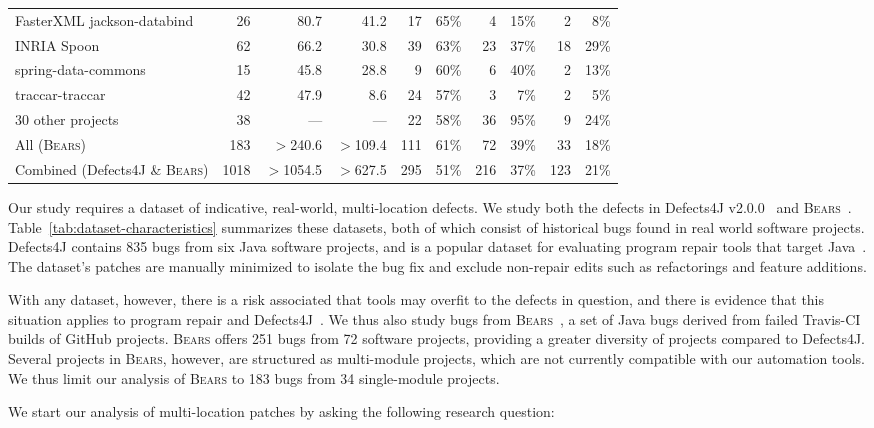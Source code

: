 \documentclass[10pt, conference]{IEEEtran}
\newcommand\bears{\textsc{Bears}\xspace}
\begin{document}
\begin{table*}
\begin{center}
\begin{tabular}{l  rrr | rr | rr | rr}
\midrule
FasterXML jackson-databind & 26 & 80.7 & 41.2 & 17 & 65\% & 4 & 15\% & 2 & 8\%\\
INRIA Spoon & 62 & 66.2 & 30.8  & 39 & 63\% & 23 & 37\% & 18 & 29\%\\
spring-data-commons & 15 & 45.8 & 28.8  & 9 & 60\% & 6 & 40\% & 2 & 13\%\\
traccar-traccar & 42 & 47.9 & 8.6 & 24 & 57\% & 3 & 7\% & 2 & 5\%\\
30 other projects & 38 & --- & --- & 22 & 58\% & 36 & 95\% & 9 & 24\%\\
\midrule
All (\bears) & 183 & $>$240.6 & $>$109.4 & 111 & 61\% & 72 & 39\% & 33 & 18\% \\
\midrule
Combined (Defects4J \& \bears) & 1018 & $>$1054.5 & $>$627.5 & 295 & 51\% & 216 & 37\% & 123 & 21\%\\
\bottomrule
\end{tabular}
\end{center}
\caption{\label{tab:dataset-characteristics} Characteristics of the Defects4J (top) and \bears (bottom) datasets.}
\end{table*}

Our study requires a dataset of indicative, real-world,
multi-location defects.  We study both the defects in
Defects4J v2.0.0~\cite{defects4j} and \bears~\cite{bears}.  Table~\ref{tab:dataset-characteristics}
summarizes these datasets, both of which
consist of historical
bugs found in real world software projects. Defects4J contains 835 bugs from 
six Java software projects, and is a popular dataset for evaluating 
program repair tools that target Java~\cite{durieux-repair-them-all}.
The dataset's patches are manually minimized to isolate the bug fix 
and exclude non-repair edits such as refactorings and feature additions.

With any dataset, however, there is a risk associated that tools may overfit
to the defects in question, and there is evidence that this situation applies to
program repair and Defects4J~\cite{durieux-repair-them-all}. 
We thus also study bugs from \bears~\cite{bears}, 
a set of Java bugs derived from failed Travis-CI builds of GitHub projects. 
\bears offers 251 bugs from 72 software projects, providing a greater diversity of 
projects compared to Defects4J. 
Several projects in \bears, however, are structured as multi-module projects, 
which are not currently compatible with our automation tools.
We thus limit our analysis of \bears to 183 bugs from 34 single-module projects.


We start our analysis of multi-location patches by asking the following research question:
\end{document}
